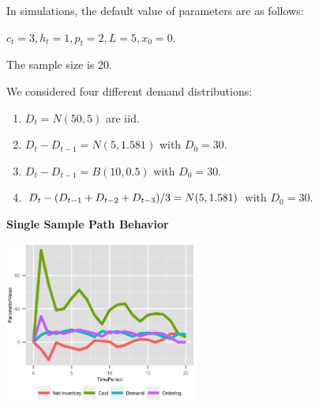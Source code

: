 \documentclass[twoside]{article}
\begin{document}
\begin{multicols}{2}
In simulations, the default value of parameters are as follows:
\begin{compactitem}
      \item $c_t = 3, h_t = 1, p_t = 2, L=5, x_0=0$.
      \item The sample size is 20.
      \item We considered four different demand distributions:
      \small
      \begin{enumerate}
            \item $D_t = N(50,5)$ are iid.
            \item $D_t-D_{t-1} = N(5,1.581)$ with $D_0=30$.
            \item $D_t-D_{t-1} = B(10,0.5)$ with $D_0=30$.
            \item $D_t- (D_{t-1} + D_{t-2} + D_{t-3})/3\\=N(5,1.581)$ with $D_0=30$.
      \end{enumerate}
      \normalsize
\end{compactitem}

\begin{center}
  \textbf{Single Sample Path Behavior}
\end{center}
\begin{center}
  \label{figure:DualBalancingParameters}
  \includegraphics[width=2.5in]{figures/DualBalancingParameters.png}
\end{center}


\end{multicols}
\end{document}
